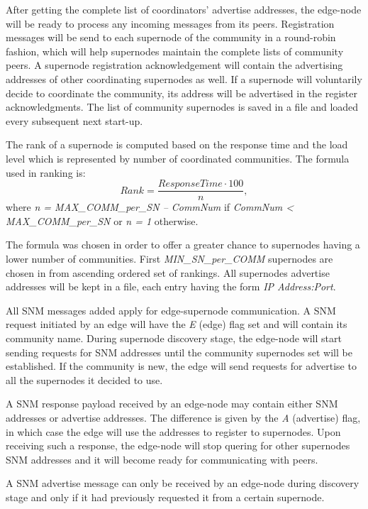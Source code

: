 After getting the complete list of coordinators' advertise addresses, the edge-node will be ready to process any incoming messages from its peers. Registration messages will be send to each supernode of the community in a round-robin fashion, which will help supernodes maintain the complete lists of community peers. A supernode registration acknowledgement will contain the advertising addresses of other coordinating supernodes as well. If a supernode will voluntarily decide to coordinate the community, its address will be advertised in the register acknowledgments. The list of community supernodes is saved in a file and loaded every subsequent next start-up.

The rank of a supernode is computed based on the response time and the load level which is represented by  number of coordinated communities. The formula used in ranking is:
\[
Rank = \frac{ResponseTime \cdot 100}{n},
\]
where \emph{n = MAX_COMM_per_SN – CommNum} if \emph{CommNum < MAX_COMM_per_SN} or \emph{n = 1} otherwise.

The formula was chosen in order to offer a greater chance to supernodes having a lower number of communities. First \emph{MIN_SN_per_COMM} supernodes are chosen in from ascending ordered set of rankings. All supernodes advertise addresses will be kept in a file, each entry having the form \emph{IP Address:Port}.

All SNM messages added apply for edge-supernode communication. A SNM request initiated by an edge will have the \emph{E} (edge) flag set and will contain its community name. During supernode discovery stage, the edge-node will start sending requests for SNM addresses until the community supernodes set will be established. If the community is new, the edge will send requests for advertise to all the supernodes it decided to use.

A SNM response payload received by an edge-node may contain either SNM addresses or advertise addresses. The difference is given by the \emph{A} (advertise) flag, in which case the edge will use the addresses to register to supernodes. Upon receiving  such a response, the edge-node will stop quering for other supernodes SNM addresses and it will become ready for communicating with peers.

A SNM advertise message can only be received by an edge-node during discovery stage and only if it had previously requested it from a certain supernode.